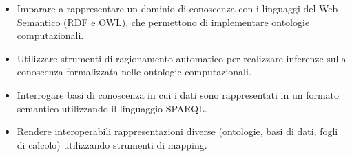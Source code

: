 \begin{itemize}
  \item Imparare a rappresentare un dominio di conoscenza con i linguaggi
del Web Semantico (RDF e OWL), che permettono di implementare
ontologie computazionali. 
\item Utilizzare strumenti di ragionamento automatico per realizzare
inferenze sulla conoscenza formalizzata nelle ontologie
computazionali. 
\item Interrogare basi di conoscenza in cui i dati sono rappresentati in un
formato semantico utilizzando il linguaggio SPARQL. 
\item Rendere interoperabili rappresentazioni diverse (ontologie, basi di
dati, fogli di calcolo) utilizzando strumenti di mapping.
\end{itemize}








